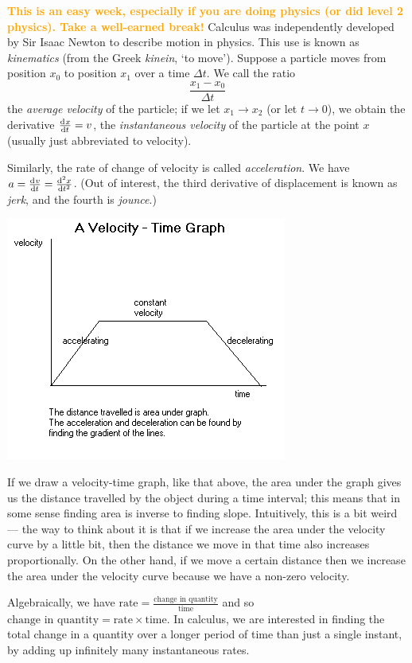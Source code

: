 


\textcolor{orange}{\textbf{This is an easy week, especially if you are doing physics (or did level 2 physics). Take a well-earned break!}}
Calculus was independently developed by Sir Isaac Newton to describe motion in physics. This use is known as \textit{kinematics} (from the
Greek \textit{kinein}, `to move'). Suppose a particle moves from position $ x_0 $ to position $ x_1 $ over a time $ \Delta t $. We call the
ratio
\begin{displaymath}
  \frac{x_1 - x_0}{\Delta t}
\end{displaymath}
the \textit{average velocity} of the particle; if we let $ x_1 \to x_2 $ (or let $ t \to 0 $), we obtain the derivative $ \od{x}{t} = v $, the
\textit{instantaneous velocity} of the particle at the point $ x $ (usually just abbreviated to velocity).

Similarly, the rate of change of velocity is called \textit{acceleration}. We have $ a = \od{v}{t} = \od[2]{x}{t} $. (Out of interest, the third
derivative of displacement is known as \textit{jerk}, and the fourth is \textit{jounce}.)

\begin{center}
  \includegraphics[width=0.5\linewidth]{vgraph}
\end{center}
If we draw a velocity-time graph, like that above, the area under the graph gives us the distance travelled by the object
during a time interval; this means that in some sense finding area is inverse to finding slope. Intuitively, this is a bit
weird --- the way to think about it is that if we increase the area under the velocity curve by a little bit, then the distance
we move in that time also increases proportionally. On the other hand, if we move a certain distance then we increase the area
under the velocity curve because we have a non-zero velocity.

Algebraically, we have $ \text{rate} = \frac{\text{change in quantity}}{\text{time}} $ and
so $ \text{change in quantity} = \text{rate} \times \text{time} $. In calculus, we are interested
in finding the total change in a quantity over a longer period of time than just a single instant,
by adding up infinitely many instantaneous rates.

